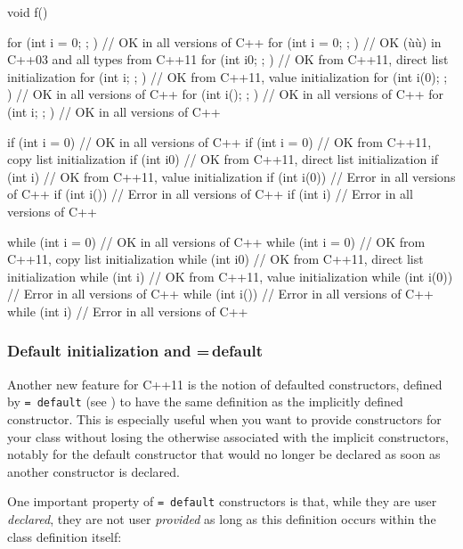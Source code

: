 \begin{emcppslisting}
void f()
{
   for (int i = 0; ; ) {}    // OK in all versions of C++
   for (int i = {0}; ; ) {}  // OK (ù{}ù) in C++03 and all types from C++11
   for (int i{0}; ; ) {}     // OK from C++11, direct list initialization
   for (int i{}; ; ) {}      // OK from C++11, value initialization
   for (int i(0); ; ) {}     // OK in all versions of C++
   for (int i(); ; ) {}      // OK in all versions of C++
   for (int i; ; ) {}        // OK in all versions of C++

   if (int i = 0) {}    // OK in all versions of C++
   if (int i = {0}) {}  // OK from C++11, copy list initialization
   if (int i{0}) {}     // OK from C++11, direct list initialization
   if (int i{}) {}      // OK from C++11, value initialization
   if (int i(0)) {}     // Error in all versions of C++
   if (int i()) {}      // Error in all versions of C++
   if (int i) {}        // Error in all versions of C++

   while (int i = 0) {}    // OK in all versions of C++
   while (int i = {0}) {}  // OK from C++11, copy list initialization
   while (int i{0}) {}     // OK from C++11, direct list initialization
   while (int i{}) {}      // OK from C++11, value initialization
   while (int i(0)) {}     // Error in all versions of C++
   while (int i()) {}      // Error in all versions of C++
   while (int i) {}        // Error in all versions of C++
}
\end{emcppslisting}


\subsubsection[Default initialization and \lstinline!=!\,\lstinline!default!]{Default initialization and {\SubsubsecCode =}\,{\SubsubsecCode default}}\label{default-initialization-and-=-default}

Another new feature for C++11 is the notion of defaulted constructors,
defined by \lstinline!=!~\lstinline!default! (see ) to have
the same definition as the implicitly defined constructor. This is
especially useful when you want to provide constructors for your class
without losing the  otherwise associated with the
implicit constructors, notably for the default constructor that would no
longer be declared as soon as another constructor is declared.

One important property of \lstinline!=!~\lstinline!default! constructors is
that, while they are user \emph{declared}, they are not user
\emph{provided} as long as this definition occurs within the class
definition itself:

